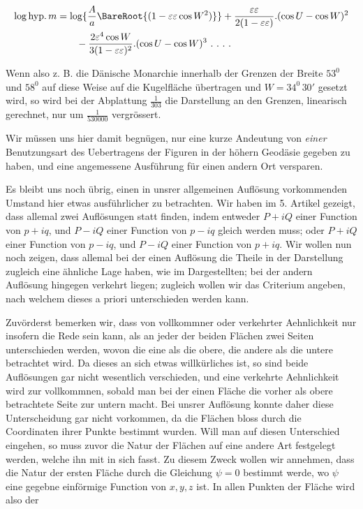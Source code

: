 %
\[
\begin{aligned}
\log\mathrm{hyp}.\,m&=\log\{\frac{A}{a}\BareRoot{(1-\varepsilon\varepsilon\cos W^2)}\}+\frac{\varepsilon\varepsilon}{2(1-\varepsilon\varepsilon)}\mathord{.}(\cos U-\cos W)^2\\
&\qquad-\frac{2\varepsilon^4\cos W}{3(1-\varepsilon\varepsilon)^2}\mathord{.}(\cos U-\cos W)^3\ .\ .\ .\ .
\end{aligned}
\]
\par\indent Wenn also z. B. die Dänische Monarchie innerhalb der Grenzen der Breite \(53^0\) und \(58^0\) auf diese Weise auf die Kugelfläche übertragen und \(W=34^0\,30'\) gesetzt wird, so wird bei der Abplattung \(\frac{1}{303}\) die Darstellung an den Grenzen, linearisch gerechnet, nur um \(\frac{1}{530000}\) vergrössert.

Wir müssen uns hier damit begnügen, nur eine kurze Andeutung von \textit{einer} Benutzungsart des Uebertragens der Figuren in der höhern Geodäsie gegeben zu haben, und eine angemessene Ausführung für einen andern Ort versparen.

Es bleibt uns noch übrig, einen in unsrer allgemeinen Auflösung vorkommenden Umstand hier etwas ausführlicher zu betrachten. Wir haben im 5. Artikel gezeigt, dass allemal zwei Auflösungen statt finden, indem entweder \(P+iQ\) einer Function von \(p+iq\), und \(P-iQ\) einer Function von \(p-iq\) gleich werden muss; oder \(P+iQ\) einer Function von \(p-iq\), und \(P-iQ\) einer Function von \(p+iq\). Wir wollen nun noch zeigen, dass allemal bei der einen Auflösung die Theile in der Darstellung zugleich eine ähnliche Lage haben, wie im Dargestellten; bei der andern Auflösung hingegen verkehrt liegen; zugleich wollen wir das Criterium angeben, nach welchem dieses a priori unterschieden werden kann.

Zuvörderst bemerken wir, dass von vollkommner oder verkehrter Aehnlichkeit nur insofern die Rede sein kann, als an jeder der beiden Flächen zwei Seiten unterschieden werden, wovon die eine als die obere, die andere als die untere betrachtet wird. Da dieses an sich etwas willkürliches ist, so sind beide Auflösungen gar nicht wesentlich verschieden, und eine verkehrte Aehnlichkeit wird zur vollkommnen, sobald man bei der einen Fläche die vorher als obere betrachtete Seite zur untern macht. Bei unsrer Auflösung konnte daher diese Unterscheidung gar nicht vorkommen, da die Flächen bloss durch die Coordinaten ihrer Punkte bestimmt wurden. Will man auf diesen Unterschied eingehen, so muss zuvor die Natur der Flächen auf eine andere Art festgelegt werden, welche ihn mit in sich fasst. Zu diesem Zweck wollen wir annehmen, dass die Natur der ersten Fläche durch die Gleichung \(\psi=0\) bestimmt werde, wo \(\psi\) eine gegebne einförmige Function von \(x,y,z\) ist. In allen Punkten der Fläche wird also der
